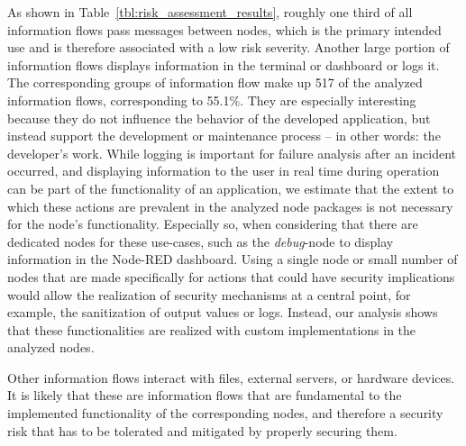 As shown in Table~\ref{tbl:risk_assessment_results}, roughly one third of all information flows pass messages between nodes, which is the primary intended use and is therefore associated with a low risk severity.
Another large portion of information flows displays information in the terminal or dashboard or logs it.
The corresponding groups of information flow make up 517 of the analyzed information flows, corresponding to 55.1\%.
They are especially interesting because they do not influence the behavior of the developed application, but instead support the development or maintenance process -- in other words: the developer's work.
While logging is important for failure analysis after an incident occurred, and displaying information to the user in real time during operation can be part of the functionality of an application, we estimate that the extent to which these actions are prevalent in the analyzed node packages is not necessary for the node's functionality.
Especially so, when considering that there are dedicated nodes for these use-cases, such as the \textit{debug}-node to display information in the Node-RED dashboard. 
Using a single node or small number of nodes that are made specifically for actions that could have security implications would allow the realization of security mechanisms at a central point, for example, the sanitization of output values or logs.
Instead, our analysis shows that these functionalities are realized with custom implementations in the analyzed nodes.

Other information flows interact with files, external servers, or hardware devices.
It is likely that these are information flows that are fundamental to the implemented functionality of the corresponding nodes, and therefore a security risk that has to be tolerated and mitigated by properly securing them.











 